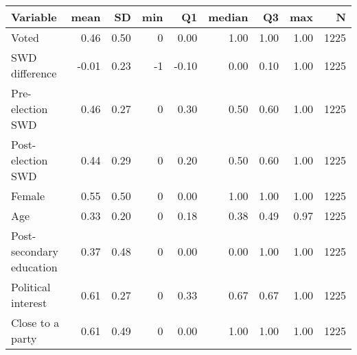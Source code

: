 
\begin{tabular}{l|r|r|r|r|r|r|r|r}
\hline
Variable & mean & SD & min & Q1 & median & Q3 & max & N\\
\hline
Voted & 0.46 & 0.50 & 0 & 0.00 & 1.00 & 1.00 & 1.00 & 1225\\
\hline
SWD difference & -0.01 & 0.23 & -1 & -0.10 & 0.00 & 0.10 & 1.00 & 1225\\
\hline
Pre-election SWD & 0.46 & 0.27 & 0 & 0.30 & 0.50 & 0.60 & 1.00 & 1225\\
\hline
Post-election SWD & 0.44 & 0.29 & 0 & 0.20 & 0.50 & 0.60 & 1.00 & 1225\\
\hline
Female & 0.55 & 0.50 & 0 & 0.00 & 1.00 & 1.00 & 1.00 & 1225\\
\hline
Age & 0.33 & 0.20 & 0 & 0.18 & 0.38 & 0.49 & 0.97 & 1225\\
\hline
Post-secondary education & 0.37 & 0.48 & 0 & 0.00 & 0.00 & 1.00 & 1.00 & 1225\\
\hline
Political interest & 0.61 & 0.27 & 0 & 0.33 & 0.67 & 0.67 & 1.00 & 1225\\
\hline
Close to a party & 0.61 & 0.49 & 0 & 0.00 & 1.00 & 1.00 & 1.00 & 1225\\
\hline
\end{tabular}
